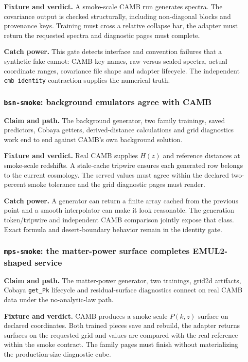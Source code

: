 \documentclass[10pt,aps,prd,twocolumn,nofootinbib]{revtex4-2}
\newcommand{\code}[1]{\texttt{#1}}
\begin{document}
\textbf{Fixture and verdict.}  A smoke-scale CAMB run generates spectra.  The
covariance output is checked structurally, including non-diagonal blocks and
provenance keys.  Training must cross a relative collapse bar, the adapter
must return the requested spectra and diagnostic pages must complete.

\textbf{Catch power.}  This gate detects interface and convention failures
that a synthetic fake cannot: CAMB key names, raw versus scaled spectra,
actual coordinate ranges, covariance file shape and adapter lifecycle.  The
independent \code{cmb-identity} contraction supplies the numerical truth.

\subsubsection{\code{bsn-smoke}: background emulators agree with CAMB}

\textbf{Claim and path.}  The background generator, two family trainings,
saved predictors, Cobaya getters, derived-distance calculations and grid
diagnostics work end to end against CAMB's own background solution.

\textbf{Fixture and verdict.}  Real CAMB supplies \(H(z)\) and reference
distances at smoke-scale redshifts.  A stale-cache tripwire ensures each
generated row belongs to the current cosmology.  The served values must agree
within the declared two-percent smoke tolerance and the grid diagnostic pages
must render.

\textbf{Catch power.}  A generator can return a finite array cached from the
previous point and a smooth interpolator can make it look reasonable.  The
generation token/tripwire and independent CAMB comparison jointly expose that
class.  Exact formula and desert-boundary behavior remain in the identity
gate.

\subsubsection{\code{mps-smoke}: the matter-power surface completes EMUL2-shaped service}

\textbf{Claim and path.}  The matter-power generator, two trainings,
grid2d artifacts, Cobaya \code{get\_Pk} lifecycle and residual-surface
diagnostics connect on real CAMB data under the no-analytic-law path.

\textbf{Fixture and verdict.}  CAMB produces a smoke-scale
\(P(k,z)\) surface on declared coordinates.  Both trained pieces save and
rebuild, the adapter returns surfaces on the requested grid and values are
compared with the real reference within the smoke contract.  The family pages
must finish without materializing the production-size diagnostic cube.
\end{document}
